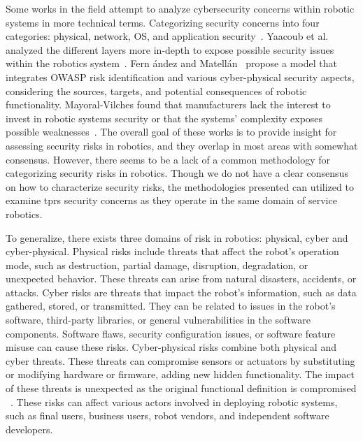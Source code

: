 Some works in the field attempt to analyze cybersecurity concerns within robotic
systems in more technical terms. Categorizing security concerns into four categories: physical, network, OS, and
application security~\cite[5]{robot_security_framework_2018}. Yaacoub et al. analyzed the different layers more in-depth to expose possible security issues within the robotics system~\cite[]{robotics_cyber_security_2022}. Fern
ández and
Matellán~\cite[
  76]{cyber_sec_robotics_privacy_safety_2017} propose a model that
integrates \ac{OWASP} risk identification and various cyber-physical security aspects, considering the sources, targets, and potential consequences of robotic functionality. Mayoral-Vilches found that manufacturers lack the interest to invest in robotic systems security or that the systems' complexity exposes possible weaknesses~\cite[]{robot_security_review_2022}. The overall goal of these works is to provide insight for assessing security risks in robotics, and they overlap in most areas with somewhat consensus. However, there seems to be a lack of a common methodology for categorizing security risks in robotics. Though we do not have a clear consensus on how to characterize security risks, the methodologies presented can utilized to examine \ac{tprs} security concerns as they operate in the
same domain of service robotics.

To generalize, there exists three domains of risk in robotics:
physical, cyber and cyber-physical.
Physical risks include threats that affect the robot's operation mode, such as destruction, partial damage, disruption, degradation, or unexpected behavior. These threats can arise from natural disasters, accidents, or attacks. Cyber risks are threats that impact the robot's information, such as data gathered, stored, or transmitted. They can be related to issues in the robot's software, third-party libraries, or general vulnerabilities in the software components. Software flaws, security configuration issues, or software feature misuse can cause these risks.
Cyber-physical risks combine both physical and cyber threats. These threats can compromise sensors or actuators by substituting or
modifying hardware or firmware, adding new hidden functionality.
The impact of these threats is unexpected as the original functional
definition is compromised ~\cite[77-78]{cyber_sec_robotics_privacy_safety_2017}. These risks can affect various actors involved in deploying robotic systems, such as final users, business users, robot vendors, and independent software developers.

